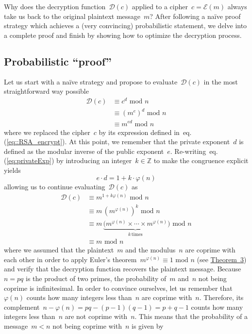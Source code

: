 \documentclass{article}
\begin{document}
Why does the decryption function~$\mathcal{D}(c)$ applied to a cipher~$c = \mathcal{E}(m)$ always take us back to the original plaintext message~$m$?  After following a na\"ive proof strategy which achieves a (very convincing) probabilistic statement, we delve into a complete proof and finish by showing how to optimize the decryption process.

\subsection{Probabilistic ``proof''}
\label{sec::probaProof}

\noindent Let us start with a na\"ive strategy and propose to evaluate~$\mathcal{D}(c)$ in the most straightforward way possible
\begin{align*}
\mathcal{D}(c) &\equiv c^d \,\,\text{mod}\,\,n \\
&\equiv (m^e)^d \,\,\text{mod}\,\,n \\
&\equiv m^{e d} \,\,\text{mod}\,\,n
\end{align*}
where we replaced the cipher~$c$ by its expression defined in~eq.(\ref{eq::RSA_encrypt}).  At this point, we remember that the private exponent~$d$ is defined as the modular inverse of the public exponent~$e$. Re-writing~eq.(\ref{eq:privateExp}) by introducing an integer~$k \in \mathbb{Z}$ to make the congruence explicit yields
\begin{equation*}
e \cdot d = 1 + k \cdot \varphi(n)
\end{equation*}
allowing us to continue evaluating~$\mathcal{D}(c)$ as
\begin{align*}
\mathcal{D}(c) &\equiv m^{1 + k \varphi(n)} \,\,\text{mod}\,\,n \\
&\equiv m \, (m^{\varphi(n)})^k \,\,\text{mod}\,\,n \\
&\equiv m \, \underbrace{\big( m^{\varphi(n)} \times \cdots \times m^{\varphi(n)}}_{k \, \text{times}} \big) \,\,\text{mod}\,\,n \\
&\equiv m \,\,\text{mod}\,\,n 
\end{align*}
where we assumed that the plaintext~$m$ and the modulus~$n$ are coprime with each other in order to apply Euler's theorem~$m^{\varphi(n)} \equiv 1 \,\,\text{mod}\,\,n$ (see \hyperlink{theorem3}{Theorem~3}) and verify that the decryption function recovers the plaintext message.  Because~$n=pq$ is the product of two primes, the probability of~$m$ and~$n$ not being coprime is infinitesimal.  In order to convince ourselves, let us remember that~$\varphi(n)$ counts how many integers less than~$n$ are coprime with~$n$.  Therefore, its complement~$n - \varphi(n) = pq - (p-1)(q-1) = p + q - 1$ counts how many integers less than~$n$ are not coprime with~$n$.  This means that the probability of a message~$m<n$ not being coprime with~$n$ is given by
\end{document}
